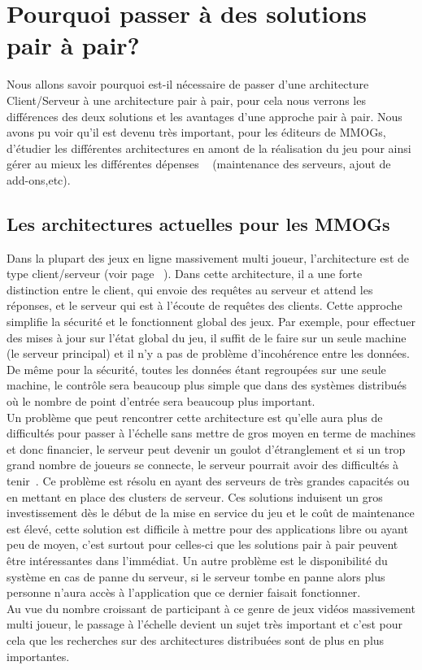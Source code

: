 \section{Pourquoi passer à des solutions pair à pair?}
	\label{whyp2p}
	Nous allons savoir pourquoi est-il nécessaire de passer d'une architecture Client/Serveur à une architecture pair à pair, pour cela nous verrons les différences des deux solutions et les avantages d'une approche pair à pair. Nous avons pu voir qu'il est devenu très important, pour les éditeurs de MMOGs, d'étudier les différentes architectures en amont de la réalisation du jeu pour ainsi gérer au mieux les différentes dépenses ~\cite{14101410} (maintenance des serveurs, ajout de add-ons,etc).
	\subsection{Les architectures actuelles pour les MMOGs}
	Dans la plupart des jeux en ligne massivement multi joueur, l'architecture est de type client/serveur (voir page ~\pageref{P2P/ClServ}). Dans cette architecture, il a une forte distinction entre le client, qui envoie des requêtes au serveur et attend les réponses, et le serveur qui est à l'écoute de requêtes des clients. Cette approche simplifie la sécurité et le fonctionnent global des jeux. Par exemple, pour effectuer des mises à jour sur l'état global du jeu, il suffit de le faire sur un seule machine (le serveur principal) et il n'y a pas de problème d'incohérence entre les données. De même pour la sécurité, toutes les données étant regroupées sur une seule machine, le contrôle sera beaucoup plus simple que dans des systèmes distribués où le nombre de point d'entrée sera beaucoup plus important. \\
	Un problème que peut rencontrer cette architecture est qu'elle aura plus de difficultés pour passer à l'échelle sans mettre de gros moyen en terme de machines et donc financier, le serveur peut devenir un goulot d'étranglement et si un trop grand nombre de joueurs se connecte, le serveur pourrait avoir des difficultés à tenir~\cite{1198269}. Ce problème est résolu en ayant des serveurs de très grandes capacités ou en mettant en place des clusters de serveur. Ces solutions induisent un gros investissement dès le début de la mise en service du jeu et le coût de maintenance est élevé, cette solution est difficile à mettre pour des applications libre ou ayant peu de moyen, c'est surtout pour celles-ci que les solutions pair à pair peuvent être intéressantes dans l'immédiat. Un autre problème est le disponibilité du système en cas de panne du serveur, si le serveur tombe en panne alors plus personne n'aura accès à l'application que ce dernier faisait fonctionner. \\
	Au vue du nombre croissant de participant à ce genre de jeux vidéos massivement multi joueur, le passage à l'échelle devient un sujet très important et c'est pour cela que les recherches sur des architectures distribuées sont de plus en plus importantes. \\

